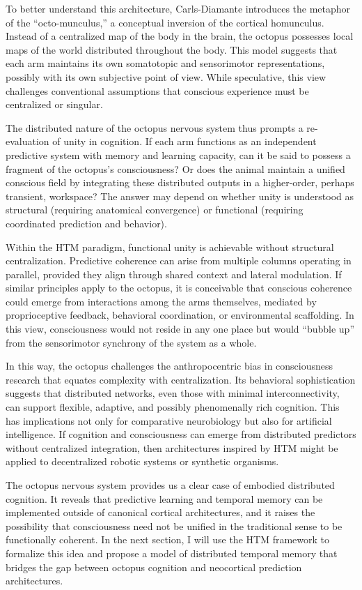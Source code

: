 \documentclass{article}
\begin{document}
To better understand this architecture, Carls-Diamante introduces the metaphor of the “octo-munculus,” a conceptual inversion of the cortical homunculus. Instead of a centralized map of the body in the brain, the octopus possesses local maps of the world distributed throughout the body. This model suggests that each arm maintains its own somatotopic and sensorimotor representations, possibly with its own subjective point of view. While speculative, this view challenges conventional assumptions that conscious experience must be centralized or singular.

The distributed nature of the octopus nervous system thus prompts a re-evaluation of unity in cognition. If each arm functions as an independent predictive system with memory and learning capacity, can it be said to possess a fragment of the octopus’s consciousness? Or does the animal maintain a unified conscious field by integrating these distributed outputs in a higher-order, perhaps transient, workspace? The answer may depend on whether unity is understood as structural (requiring anatomical convergence) or functional (requiring coordinated prediction and behavior).

Within the HTM paradigm, functional unity is achievable without structural centralization. Predictive coherence can arise from multiple columns operating in parallel, provided they align through shared context and lateral modulation. If similar principles apply to the octopus, it is conceivable that conscious coherence could emerge from interactions among the arms themselves, mediated by proprioceptive feedback, behavioral coordination, or environmental scaffolding. In this view, consciousness would not reside in any one place but would “bubble up” from the sensorimotor synchrony of the system as a whole.

In this way, the octopus challenges the anthropocentric bias in consciousness research that equates complexity with centralization. Its behavioral sophistication suggests that distributed networks, even those with minimal interconnectivity, can support flexible, adaptive, and possibly phenomenally rich cognition. This has implications not only for comparative neurobiology but also for artificial intelligence. If cognition and consciousness can emerge from distributed predictors without centralized integration, then architectures inspired by HTM might be applied to decentralized robotic systems or synthetic organisms.

The octopus nervous system provides us a clear case of embodied distributed cognition. It reveals that predictive learning and temporal memory can be implemented outside of canonical cortical architectures, and it raises the possibility that consciousness need not be unified in the traditional sense to be functionally coherent. In the next section, I will use the HTM framework to formalize this idea and propose a model of distributed temporal memory that bridges the gap between octopus cognition and neocortical prediction architectures.
\end{document}
